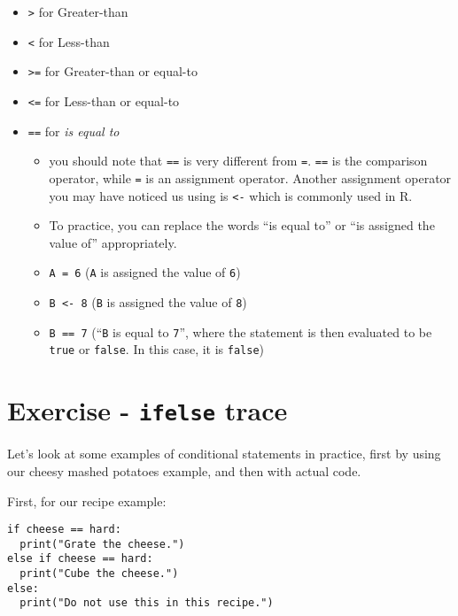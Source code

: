 \documentclass[
]{book}
\providecommand{\tightlist}{%
  \setlength{\itemsep}{0pt}\setlength{\parskip}{0pt}}
\begin{document}
\begin{itemize}
\tightlist
\item
  \texttt{\textgreater{}} for Greater-than
\item
  \texttt{\textless{}} for Less-than
\item
  \texttt{\textgreater{}=} for Greater-than or equal-to
\item
  \texttt{\textless{}=} for Less-than or equal-to
\item
  \texttt{==} for \emph{is equal to}

  \begin{itemize}
  \tightlist
  \item
    you should note that \texttt{==} is very different from \texttt{=}. \texttt{==} is the comparison operator, while \texttt{=} is an assignment operator. Another assignment operator you may have noticed us using is \texttt{\textless{}-} which is commonly used in R.
  \item
    To practice, you can replace the words ``is equal to'' or ``is assigned the value of'' appropriately.
  \item
    \texttt{A\ =\ 6} (\texttt{A} is assigned the value of \texttt{6})
  \item
    \texttt{B\ \textless{}-\ 8} (\texttt{B} is assigned the value of \texttt{8})
  \item
    \texttt{B\ ==\ 7} (``\texttt{B} is equal to \texttt{7}'', where the statement is then evaluated to be \texttt{true} or \texttt{false}. In this case, it is \texttt{false})
  \end{itemize}
\end{itemize}

\section{\texorpdfstring{Exercise - \texttt{ifelse} trace}{Exercise - ifelse trace}}\label{exercise---ifelse-trace}

Let's look at some examples of conditional statements in practice, first by using our cheesy mashed potatoes example, and then with actual code.

First, for our recipe example:

\begin{verbatim}
if cheese == hard:
  print("Grate the cheese.")
else if cheese == hard:
  print("Cube the cheese.")
else:
  print("Do not use this in this recipe.")
  
\end{verbatim}
\end{document}
